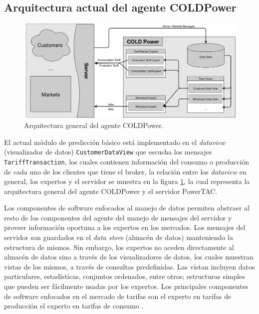\subsection{Arquitectura actual del agente COLDPower} \label{sec:arquitecturaActualAgente}

\begin{figure}[ht]
	\centering
	\includegraphics[width=16cm]{img/arquitecturaGeneral.png}
	\caption{Arquitectura general del agente COLDPower.}
	\label{fig:arquitecturaGeneral}
\end{figure}

El actual módulo de predicción básico está implementado en el \textit{dataview} (visualizador de datos)  \texttt{CustomerDataView} %
que escucha los mensajes \texttt{TariffTransaction}, los cuales contienen información del consumo o producción de cada uno de los clientes que tiene el broker, la relación entre los \textit{dataview} en general, los expertos y el servidor se muestra en la figura \ref{fig:arquitecturaGeneral}, la cual representa la arquitectura general del agente COLDPower y el servidor PowerTAC.

Los componentes de software enfocados al manejo de datos permiten abstraer al resto de los componentes del agente del manejo de mensajes del servidor y proveer información oportuna a los expertos en los mercados. Los mensajes del servidor son guardados en el \textit{data store} (almacén de datos) manteniendo la estructura de mismos. Sin embargo, los expertos no aceden directamente al
almacén de datos sino a través de los visualizadores de datos, los cuales muestran vistas de los mismos, a través de consultas predefinidas. Las vistan incluyen datos particulares, estadísticas, conjuntos ordenados, entre otros; estructuras simples que pueden ser fácilmente usadas por los expertos. Los principales componentes de software enfocados en el mercado de tarifas son el experto en tarifas de producción  el experto en tarifas de consumo \cite{Entregable4CemieEolico}. 

